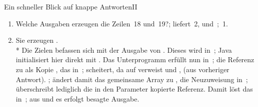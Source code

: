 {{\begin{frame}{Ein schneller Blick auf knappe Antworten\hfill II}
\begin{enumerate}[<+(1)->]
    \itemsep10pt
    \item {\intask Welche Ausgaben erzeugen die Zeilen~18 und~19?}\hfill{}; liefert~2, und~;~1.
    \item {}\par
    \pause Sie erzeugen  .\smallskip\\*
    \pause Die Zielen befassen sich mit der Ausgabe von . Dieses wird in~; Java initialisiert hier direkt mit . \pause Das Unterprogramm erfüllt nun in~; die Referenz zu  als Kopie , \pause das  in~; scheitert, da  auf   verweist und ,  (aus vorheriger Antwort). \pause
   ; ändert damit das gemeinsame Array zu  , die Neuzuweisung in~; überschreibt lediglich die in den Parameter kopierte Referenz. \pause
    Damit löst das  in~; aus und es erfolgt besagte Ausgabe.
\end{enumerate}
\end{frame}
}
}
\iffull
